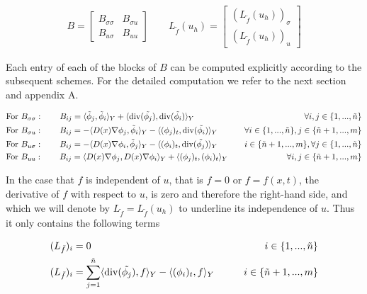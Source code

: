 \documentclass[../draft_1.tex]{subfiles}
\begin{document}
\begin{ceqn}
	\begin{align}
B = \begin{bmatrix}
B_{\sigma \sigma} & B_{\sigma u} \\
B_{u \sigma}  & B_{uu} 
\end{bmatrix}
\qquad
 L_{\tilde{f}}(u_h) = \begin{bmatrix}
(L_{\tilde{f}}(u_h))_{\sigma} \\
(L_{\tilde{f}}(u_h))_u
 \end{bmatrix}
	\end{align}
\end{ceqn}
Each entry of each of the blocks of $B$ can be computed explicitly according to the subsequent schemes. For the detailed computation we refer to the next section and appendix A. 
\begin{ceqn}
	\begin{align}
	\label{blocks_B_begin}
&\text{For } B_{\sigma \sigma} :	\qquad B_{ij} = \langle \tilde{\phi}_j, \tilde{\phi}_i \rangle_Y + \langle \mathop{}\!\mathrm{div}(\tilde{\phi_j}), \mathop{}\!\mathrm{div}(\tilde{\phi_i}) \rangle_Y \quad &\forall i,j \in \{1, ..., \tilde{n}\} \\
&\text{For } B_{\sigma u} : \qquad B_{ij} = - \langle D(x) \nabla \phi_j, \tilde{\phi}_i \rangle_Y - \langle (\phi_j)_t, \mathop{}\!\mathrm{div}(\tilde{\phi_i}) \rangle_Y \quad &\forall i \in \{1, ..., \tilde{n}\}, j \in \{\tilde{n}+1, ..., m\} \\
&\text{For } B_{u \sigma} : \qquad B_{ij} = - \langle D(x) \nabla \phi_i, \tilde{\phi}_j \rangle_Y - \langle (\phi_i)_t, \mathop{}\!\mathrm{div}(\tilde{\phi_j}) \rangle_Y \quad &i \in \{\tilde{n}+1, ..., m\}, \forall j \in \{1, ..., \tilde{n}\}\\
&\text{For } B_{uu} : \qquad B_{ij} = \langle D(x) \nabla \phi_j, D(x) \nabla \phi_i \rangle_Y + \langle (\phi_j)_t, (\phi_i)_t \rangle_Y \quad &\forall i,j \in \{\tilde{n}+1, ..., m\}
\label{block_B_end}
\end{align}
\end{ceqn}
In the case that $f$ is independent of $u$, that is $f = 0$ or $f = f(x,t)$, the derivative of $f$ with respect to $u$, is zero and therefore the right-hand side, and which we will denote by $L_{\tilde{f}} = L_{\tilde{f}}(u_h)$ to underline its independence of $u$. Thus it only contains the following terms
\begin{ceqn}
	\begin{align}
&(L_{\tilde{f}})_i = 0 \qquad &i \in \{1, ..., \tilde{n} \} \\
&(L_{\tilde{f}})_i = \sum_{j=1}^{\tilde{n}}\langle \mathop{}\!\mathrm{div}(\tilde{\phi_j}), f \rangle_Y - \langle (\phi_i)_t, f \rangle_Y \qquad  &i \in \{\tilde{n}+1, ..., m\}
\end{align}
\end{ceqn}
\end{document}
